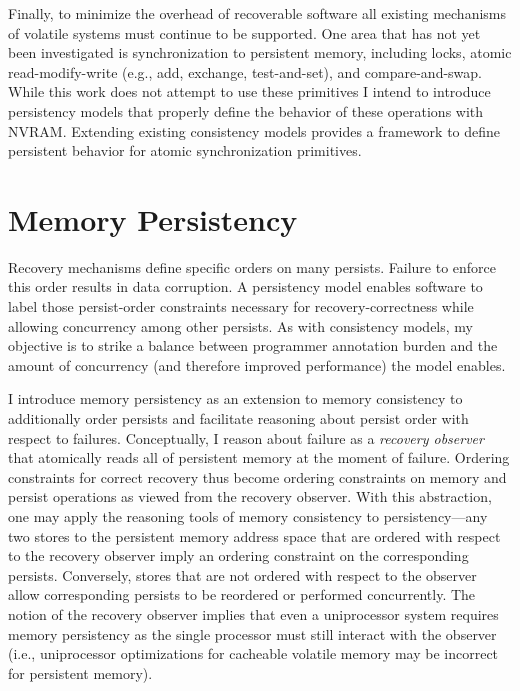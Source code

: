 Finally, to minimize the overhead of recoverable software all existing mechanisms of volatile systems must continue to be supported.
One area that has not yet been investigated is synchronization to persistent memory, including locks, atomic read-modify-write (e.g., add, exchange, test-and-set), and compare-and-swap.
While this work does not attempt to use these primitives I intend to introduce persistency models that properly define the behavior of these operations with NVRAM.
Extending existing consistency models provides a framework to define persistent behavior for atomic synchronization primitives.

\section{Memory Persistency}
\label{sec:Persistency:Persistency}

Recovery mechanisms define specific orders on many persists.
Failure to enforce this order results in data corruption.
A persistency model enables software to label those persist-order constraints necessary for recovery-correctness while allowing concurrency among other persists.
As with consistency models, my objective is to strike a balance between programmer annotation burden and the amount of concurrency (and therefore improved performance) the model enables.

I introduce memory persistency as an extension to memory consistency to additionally order persists and facilitate reasoning about persist order with respect to failures.
Conceptually, I reason about failure as a \emph{recovery observer} that atomically reads all of persistent memory at the moment of failure.
Ordering constraints for correct recovery thus become ordering constraints on memory and persist operations as viewed from the recovery observer.
With this abstraction, one may apply the reasoning tools of memory consistency to persistency---any two stores to the persistent memory address space that are ordered with respect to the recovery observer imply an ordering constraint on the corresponding persists.
Conversely, stores that are not ordered with respect to the observer allow corresponding persists to be reordered or performed concurrently.
The notion of the recovery observer implies that even a uniprocessor system requires memory persistency as the single processor must still interact with the observer (i.e., uniprocessor optimizations for cacheable volatile memory may be incorrect for persistent memory).


